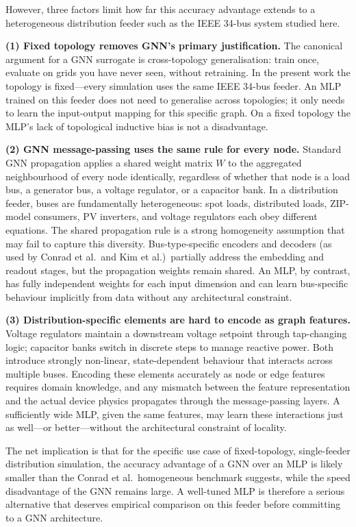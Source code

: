 \documentclass[11pt]{article}
\begin{document}
\begin{description}[style=unboxed, leftmargin=0pt, labelwidth=0pt]
  However, three factors limit how far this accuracy advantage extends to a
  heterogeneous distribution feeder such as the IEEE 34-bus system studied here.

  \textbf{(1) Fixed topology removes GNN's primary justification.}
  The canonical argument for a GNN surrogate is cross-topology
  generalisation: train once, evaluate on grids you have never seen, without
  retraining.  In the present work the topology is fixed---every simulation
  uses the same IEEE 34-bus feeder.  An MLP trained on this feeder does not
  need to generalise across topologies; it only needs to learn the
  input-output mapping for this specific graph.  On a fixed topology the
  MLP's lack of topological inductive bias is not a disadvantage.

  \textbf{(2) GNN message-passing uses the same rule for every node.}
  Standard GNN propagation applies a shared weight matrix $W$ to the
  aggregated neighbourhood of every node identically, regardless of whether
  that node is a load bus, a generator bus, a voltage regulator, or a
  capacitor bank.  In a distribution feeder, buses are fundamentally
  heterogeneous: spot loads, distributed loads, ZIP-model consumers, PV
  inverters, and voltage regulators each obey different equations.  The
  shared propagation rule is a strong homogeneity assumption that may fail
  to capture this diversity.  Bus-type-specific encoders and decoders
  (as used by Conrad et al.\ and Kim et al.)\ partially address the
  embedding and readout stages, but the propagation weights remain shared.
  An MLP, by contrast, has fully independent weights for each input
  dimension and can learn bus-specific behaviour implicitly from data
  without any architectural constraint.

  \textbf{(3) Distribution-specific elements are hard to encode as graph features.}
  Voltage regulators maintain a downstream voltage setpoint through
  tap-changing logic; capacitor banks switch in discrete steps to manage
  reactive power.  Both introduce strongly non-linear, state-dependent
  behaviour that interacts across multiple buses.  Encoding these elements
  accurately as node or edge features requires domain knowledge, and any
  mismatch between the feature representation and the actual device physics
  propagates through the message-passing layers.  A sufficiently wide MLP,
  given the same features, may learn these interactions just as well---or
  better---without the architectural constraint of locality.

  \noindent The net implication is that for the specific use case of
  fixed-topology, single-feeder distribution simulation, the accuracy
  advantage of a GNN over an MLP is likely smaller than the Conrad et al.\
  homogeneous benchmark suggests, while the speed disadvantage of the GNN
  remains large.  A well-tuned MLP is therefore a serious alternative
  that deserves empirical comparison on this feeder before committing to
  a GNN architecture.

\end{description}
\end{document}
